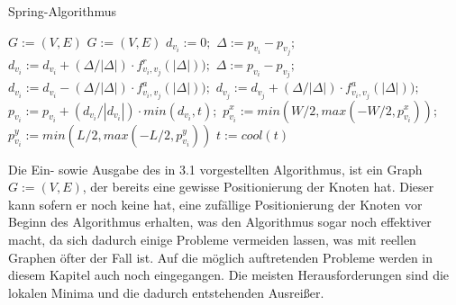 \begin{algorithm}[t]
	\centering
	\caption[Spring-Algorithmus]{Spring-Algorithmus} \label{algo_1}
	\begin{algorithmic}[1]
		\REQUIRE \begin{math} G:= (V,E) \end{math}
		\ENSURE \begin{math} G:= (V,E) \end{math}
		\STATE $d_{v_{i}} := 0;$
		\STATE $\Delta := p_{v_{i}} - p_{v_{j}};$
		\STATE $d_{v_{i}} := d_{v_{i}} + (\Delta / |\Delta|) \cdot f^{r}_{v_{i},v_{j}}(|\Delta|));$
		\ENDIF
		\ENDFOR
		\ENDFOR
		\newline
		\STATE $\Delta := p_{v_{i}} - p_{v_{j}};$
		\STATE $d_{v_{i}} := d_{v_{i}} - (\Delta / |\Delta|) \cdot f^{a}_{v_{i},v_{j}}(|\Delta|));$
		\STATE $d_{v_{j}} := d_{v_{j}} + (\Delta / |\Delta|) \cdot f^{a}_{v_{i},v_{j}}(|\Delta|));$
		\ENDFOR
		\newline
		\STATE $p_{v_{i}} := p_{v_{i}} + ( d_{v_{i}}/ |d_{v_{i}}|) \cdot min ( d_{v_{i}}, t );$
		\STATE $p_{v_{i}}^{x} := min(W/2, max(-W/2, p_{v_{i}}^{x}));$
		\STATE $p_{v_{i}}^{y} := min(L/2, max(-L/2, p_{v_{i}}^{y}))$
		\ENDFOR
		\STATE $t:= cool(t)$
		\ENDFOR
	\end{algorithmic}
\end{algorithm}

Die Ein- sowie Ausgabe des in 3.1 vorgestellten Algorithmus, ist ein Graph $G:= (V,E)$, der bereits eine gewisse Positionierung der Knoten hat. Dieser kann sofern er noch keine hat, eine zufällige Positionierung der Knoten vor Beginn des Algorithmus erhalten, was den Algorithmus sogar noch effektiver macht, da sich dadurch einige Probleme vermeiden lassen, was mit reellen Graphen öfter der Fall ist. Auf die möglich auftretenden Probleme werden in diesem Kapitel auch noch eingegangen. Die meisten Herausforderungen sind die lokalen Minima und die dadurch entstehenden Ausreißer. \\

